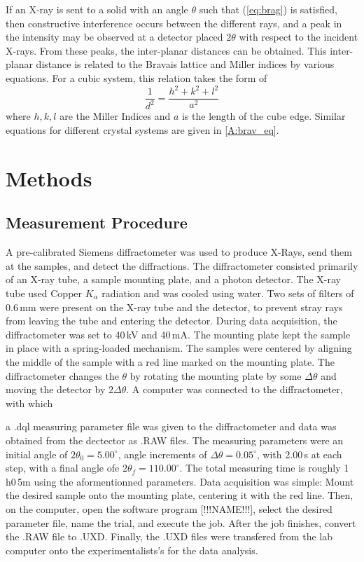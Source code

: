 \documentclass[12pt]{article}
\begin{document}
%
If an X-ray is sent to a solid with an angle $\theta$ such that (\ref{eq:brag}) is satisfied,
then constructive interference occurs between the different rays, and a peak in the intensity
may be observed at a detector placed $2\theta$ with respect to the incident X-rays. From these
peaks, the inter-planar distances can be obtained. This inter-planar distance is related
to the Bravais lattice and Miller indices by various equations. For a cubic system, this relation
takes the form of
%
\begin{equation}
	\frac{1}{d^2}=\frac{h^2+k^2+l^2}{a^2}
\end{equation}
%
where $h,k,l$ are the Miller Indices and $a$ is the length of the cube edge. Similar equations
for different crystal systems are given in \ref{A:brav_eq}. 



\section{Methods}\label{sec:met}

\subsection{Measurement Procedure}
A pre-calibrated Siemens diffractometer was used to produce X-Rays, send them at the samples, and 
detect the diffractions.
The diffractometer consisted primarily of an X-ray tube, a sample mounting plate, and a 
photon detector. The X-ray tube used Copper $K_{\alpha}$ radiation and was cooled using water. Two sets of filters of 
0.6\,mm were present on the X-ray tube and the detector, to prevent stray rays from leaving
the tube and entering the detector. During data acquisition, the diffractometer was set to 
40\,kV and 40\,mA. The mounting plate kept the sample in place with a spring-loaded mechanism. 
The samples were centered by aligning the middle of the sample with a red line marked on the 
mounting plate. The diffractometer changes the $\theta$ by rotating the mounting plate by some $\Delta\theta$
and moving the detector by $2\Delta\theta$.
A computer was connected to the diffractometer, with which

a .dql measuring parameter file was given to the diffractometer and data was obtained from the 
dectector as .RAW files. The measuring parameters were an initial angle of $2\theta_0=5.00^{\circ}$, 
angle increments of $\Delta\theta=0.05^{\circ}$, with 2.00\,s at each step, with a final 
angle ofe $2\theta_f=110.00^{\circ}$. The total measuring time is roughly 1\,h0\,5m using the aformentionned
parameters.
Data acquisition was simple: Mount the desired sample onto the mounting plate, centering it
with the red line. Then, on the computer, open the software program [!!!NAME!!!], select the desired 
parameter file, name the trial, and execute the job. After the job finishes, convert the .RAW file to .UXD.
Finally, the .UXD files were transfered from the lab computer onto the experimentalists's for 
the data analysis.
\end{document}
